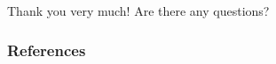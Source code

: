 \documentclass{beamer}
\begin{document}
\begin{frame}{Thank you very much!}
Are there any questions? \\
\end{frame}

\begin{frame}
  \frametitle{References}
  \printbibliography[title={References}]	
\end{frame}
\end{document}
